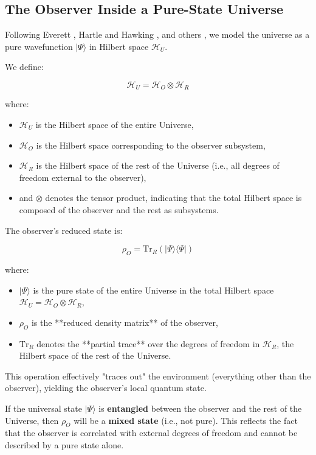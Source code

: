 \documentclass[11pt]{article}
\begin{document}
\subsection*{The Observer Inside a Pure-State Universe}

Following Everett \cite{everett1957relative}, Hartle and Hawking \cite{hartle1983wave}, and others \cite{maldacena1998largeN, witten1998ads, rovelli1997loop}, we model the universe as a pure wavefunction \(|\Psi\rangle\) in Hilbert space \(\mathcal{H}_U\).

We define:

\[
      \mathcal{H}_U = \mathcal{H}_O \otimes \mathcal{H}_R
\]

where:
\begin{itemize}
      \item \(\mathcal{H}_U\) is the Hilbert space of the entire Universe,
      \item \(\mathcal{H}_O\) is the Hilbert space corresponding to the observer subsystem,
      \item \(\mathcal{H}_R\) is the Hilbert space of the rest of the Universe (i.e., all degrees of freedom external to the observer),
      \item and \(\otimes\) denotes the tensor product, indicating that the total Hilbert space is composed of the observer and the rest as subsystems.
\end{itemize}


The observer's reduced state is:

\[
      \rho_O = \mathrm{Tr}_R \left( |\Psi\rangle \langle \Psi| \right)
\]


where:
\begin{itemize}
      \item \(|\Psi\rangle\) is the pure state of the entire Universe in the total Hilbert space \(\mathcal{H}_U = \mathcal{H}_O \otimes \mathcal{H}_R\),
      \item \(\rho_O\) is the **reduced density matrix** of the observer,
      \item \(\mathrm{Tr}_R\) denotes the **partial trace** over the degrees of freedom in \(\mathcal{H}_R\), the Hilbert space of the rest of the Universe.
\end{itemize}

This operation effectively "traces out" the environment (everything other than the observer), yielding the observer's local quantum state.

If the universal state \( |\Psi\rangle \) is \textbf{entangled} between the observer and the rest of the Universe, then \( \rho_O \) will be a \textbf{mixed state} (i.e., not pure). This reflects the fact that the observer is correlated with external degrees of freedom and cannot be described by a pure state alone.
\end{document}
